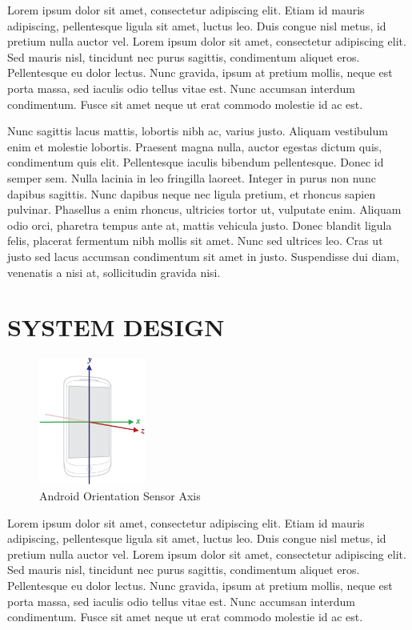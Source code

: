 \documentclass{sig-alternate}
\begin{document}
Lorem ipsum dolor sit amet, consectetur adipiscing elit. Etiam id mauris adipiscing, pellentesque ligula sit amet, luctus leo. 
Duis congue nisl metus, id pretium nulla auctor vel. Lorem ipsum dolor sit amet, consectetur adipiscing elit. Sed mauris nisl, 
tincidunt nec purus sagittis, condimentum aliquet eros. Pellentesque eu dolor lectus. Nunc gravida, ipsum at pretium mollis, neque 
est porta massa, sed iaculis odio tellus vitae est. Nunc accumsan interdum condimentum. Fusce sit amet neque ut erat commodo molestie id ac est.

Nunc sagittis lacus mattis, lobortis nibh ac, varius justo. Aliquam vestibulum enim et molestie lobortis. Praesent magna nulla, auctor
egestas dictum quis, condimentum quis elit. Pellentesque iaculis bibendum pellentesque. Donec id semper sem. Nulla lacinia in leo fringilla 
laoreet. Integer in purus non nunc dapibus sagittis. Nunc dapibus neque nec ligula pretium, et rhoncus sapien pulvinar. Phasellus a enim rhoncus,
 ultricies tortor ut, vulputate enim. Aliquam odio orci, pharetra tempus ante at, mattis vehicula justo. Donec blandit ligula felis, placerat 
 fermentum nibh mollis sit amet. Nunc sed ultrices leo. Cras ut justo sed lacus accumsan condimentum sit amet in justo. Suspendisse dui diam, 
 venenatis a nisi at, sollicitudin gravida nisi.
 
\section {SYSTEM DESIGN}
\label{sec:method}

\begin{figure}
\centering
\includegraphics[width=3.5cm]{images/android_axis.png}
\caption{Android Orientation Sensor Axis}
\label{fig:axis}
\end{figure}

Lorem ipsum dolor sit amet, consectetur adipiscing elit. Etiam id mauris adipiscing, pellentesque ligula sit amet, luctus leo. 
Duis congue nisl metus, id pretium nulla auctor vel. Lorem ipsum dolor sit amet, consectetur adipiscing elit. Sed mauris nisl, 
tincidunt nec purus sagittis, condimentum aliquet eros. Pellentesque eu dolor lectus. Nunc gravida, ipsum at pretium mollis, neque 
est porta massa, sed iaculis odio tellus vitae est. Nunc accumsan interdum condimentum. Fusce sit amet neque ut erat commodo molestie id ac est.
\end{document}
